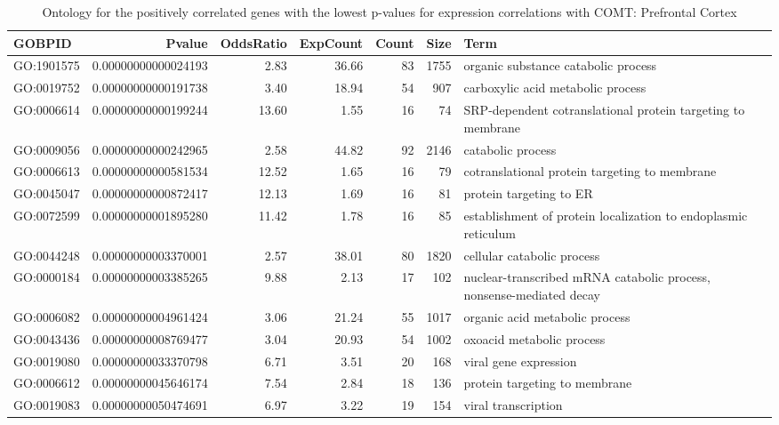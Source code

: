 \documentclass[letterpaper,12pt]{article}
\numberwithin{equation}{appendix}
\begin{document}
\noindent

\begin{landscape}

{\footnotesize {
\setlength\LTleft{-1cm}
\setlength\LTright{-1cm}
\begin{longtable}{lrrrrrl}
\caption{Ontology for the positively correlated genes with the lowest p-values for expression correlations with COMT: Prefrontal Cortex} \\ 
  \toprule
GOBPID & Pvalue & OddsRatio & ExpCount & Count & Size & Term \\ 
  \midrule
GO:1901575 & 0.00000000000024193 & 2.83 & 36.66 & 83 & 1755 & organic substance catabolic process \\ 
  GO:0019752 & 0.00000000000191738 & 3.40 & 18.94 & 54 & 907 & carboxylic acid metabolic process \\ 
  GO:0006614 & 0.00000000000199244 & 13.60 & 1.55 & 16 & 74 & SRP-dependent cotranslational protein targeting to membrane \\ 
  GO:0009056 & 0.00000000000242965 & 2.58 & 44.82 & 92 & 2146 & catabolic process \\ 
  GO:0006613 & 0.00000000000581534 & 12.52 & 1.65 & 16 & 79 & cotranslational protein targeting to membrane \\ 
  GO:0045047 & 0.00000000000872417 & 12.13 & 1.69 & 16 & 81 & protein targeting to ER \\ 
  GO:0072599 & 0.00000000001895280 & 11.42 & 1.78 & 16 & 85 & establishment of protein localization to endoplasmic reticulum \\ 
  GO:0044248 & 0.00000000003370001 & 2.57 & 38.01 & 80 & 1820 & cellular catabolic process \\ 
  GO:0000184 & 0.00000000003385265 & 9.88 & 2.13 & 17 & 102 & nuclear-transcribed mRNA catabolic process, nonsense-mediated decay \\ 
  GO:0006082 & 0.00000000004961424 & 3.06 & 21.24 & 55 & 1017 & organic acid metabolic process \\ 
  GO:0043436 & 0.00000000008769477 & 3.04 & 20.93 & 54 & 1002 & oxoacid metabolic process \\ 
  GO:0019080 & 0.00000000033370798 & 6.71 & 3.51 & 20 & 168 & viral gene expression \\ 
  GO:0006612 & 0.00000000045646174 & 7.54 & 2.84 & 18 & 136 & protein targeting to membrane \\ 
  GO:0019083 & 0.00000000050474691 & 6.97 & 3.22 & 19 & 154 & viral transcription \\ 

\end{longtable}}}
\end{landscape}
\end{document}
